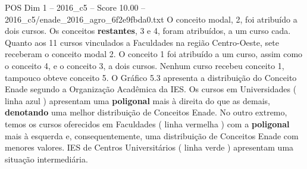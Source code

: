 \begin{textsample}{POS Dim 1 – 2016\_c5 – Score 10.00 – 2016\_c5/enade\_2016\_agro\_6f2e9fbda0.txt}
O conceito modal, 2, foi atribuído a dois cursos.
Os conceitos \textbf{restantes}, 3 e 4, foram atribuídos, a um curso cada.
Quanto aos 11 cursos vinculados a Faculdades na região Centro-Oeste, sete receberam o conceito modal 2.
O conceito 1 foi atribuído a um curso, assim como o conceito 4, e o conceito 3, a dois cursos.
Nenhum curso recebeu conceito 1, tampouco obteve conceito 5.
O Gráfico 5.3 apresenta a distribuição do Conceito Enade segundo a Organização Acadêmica da IES.
Os cursos em Universidades ( linha azul ) apresentam uma \textbf{poligonal} mais à direita do que as demais, \textbf{denotando} uma melhor distribuição de Conceitos Enade.
No outro extremo, temos os cursos oferecidos em Faculdades ( linha vermelha ) com a \textbf{poligonal} mais à esquerda e, consequentemente, uma distribuição de Conceitos Enade com menores valores.
IES de Centros Universitários ( linha verde ) apresentam uma situação intermediária.

\end{textsample}
